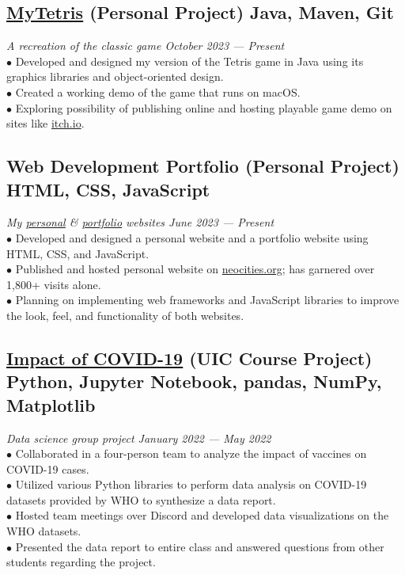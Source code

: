 \documentclass{article}
\begin{document}
\subsection{\href{https://github.com/IanLulu/MyTetris}{\underline{MyTetris}} (Personal Project) \hfill \textnormal{Java, Maven, Git}}
\vspace{-0.5em}
\textit{A recreation of the classic game \hfill October 2023 --- Present}
\\
$\bullet$ Developed and designed my version of the Tetris game in Java using its graphics libraries and object-oriented design.
\\
$\bullet$ Created a working demo of the game that runs on macOS.
\\
$\bullet$ Exploring possibility of publishing online and hosting playable game demo on sites like \url{itch.io}.
\vspace{-0.5em}

\subsection{Web Development Portfolio (Personal Project) \hfill \textnormal{HTML, CSS, JavaScript}}
\vspace{-0.5em}
\textit{My \href{https://github.com/IanLulu/neocities-website}{\underline{personal}} \& \href{https://github.com/IanLulu/ianlulu.github.io}{\underline{portfolio}} websites \hfill June 2023 --- Present}
\\
$\bullet$ Developed and designed a personal website and a portfolio website using HTML, CSS, and JavaScript.
\\
$\bullet$ Published and hosted personal website on \url{neocities.org}; has garnered over 1,800+ visits alone.
\\
$\bullet$ Planning on implementing web frameworks and JavaScript libraries to improve the look, feel, and functionality of both websites.
\vspace{-0.5em}

\subsection{\href{https://github.com/uic-cs418/cs418-spring22-the-wild-card}{\underline{Impact of COVID-19}} (UIC Course Project) \hfill \textnormal{Python, Jupyter Notebook, pandas, NumPy, Matplotlib}}
\vspace{-0.5em}
\textit{Data science group project \hfill January 2022 --- May 2022}
\\
$\bullet$ Collaborated in a four-person team to analyze the impact of vaccines on COVID-19 cases.
\\
$\bullet$ Utilized various Python libraries to perform data analysis on COVID-19 datasets provided by WHO to synthesize a data report.
\\
$\bullet$ Hosted team meetings over Discord and developed data visualizations on the WHO datasets.
\\
$\bullet$ Presented the data report to entire class and answered questions from other students regarding the project.
\end{document}
